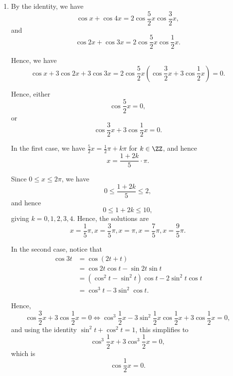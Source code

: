 \Question{\currfilebase}

\begin{enumerate}
    \item By the identity, we have
          \[
              \cos x + \cos 4x = 2 \cos \frac{5}{2} x \cos \frac{3}{2}x,
          \]
          and
          \[
              \cos 2x + \cos 3x = 2 \cos \frac{5}{2}x \cos \frac{1}{2}x.
          \]

          Hence, we have
          \[
              \cos x + 3 \cos 2x + 3 \cos 3x = 2 \cos \frac{5}{2} x \left(\cos \frac{3}{2} x + 3 \cos \frac{1}{2}x\right) = 0.
          \]

          Hence, either
          \[
              \cos \frac{5}{2} x = 0,
          \]
          or
          \[
              \cos \frac{3}{2} x + 3 \cos \frac{1}{2}x = 0.
          \]

          In the first case, we have \(\frac{5}{2} x = \frac{1}{2}\pi + k\pi\) for \(k \in \ZZ\), and hence
          \[
              x = \frac{1 + 2k}{5} \cdot \pi.
          \]

          Since \(0 \leq x \leq 2\pi\), we have
          \[
              0 \leq \frac{1 + 2k}{5} \leq 2,
          \]
          and hence
          \[
              0 \leq 1 + 2k \leq 10,
          \]
          giving \(k = 0, 1, 2, 3, 4\). Hence, the solutions are
          \[
              x = \frac{1}{5} \pi, x = \frac{3}{5} \pi, x = \pi, x = \frac{7}{5} \pi, x = \frac{9}{5}\pi.
          \]

          In the second case, notice that
          \begin{align*}
              \cos 3t & = \cos (2t + t)                                    \\
                      & = \cos 2t \cos t - \sin 2t \sin t                  \\
                      & = (\cos^2 t - \sin^2 t) \cos t - 2 \sin^2 t \cos t \\
                      & = \cos^3 t - 3 \sin^2 \cos t.
          \end{align*}

          Hence,
          \[
              \cos \frac{3}{2}x + 3\cos \frac{1}{2} x = 0 \iff \cos^3 \frac{1}{2}x - 3 \sin^2 \frac{1}{2}x \cos \frac{1}{2}x + 3 \cos \frac{1}{2}x = 0,
          \]
          and using the identity \(\sin^2 t + \cos^2 t = 1\), this simplifies to
          \[
              \cos^3 \frac{1}{2}x + 3 \cos^3 \frac{1}{2}x = 0,
          \]
          which is
          \[
              \cos \frac{1}{2}x = 0.
          \]


\end{enumerate}
